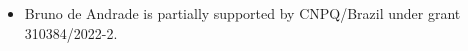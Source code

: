 \documentclass[12pt,reqno]{amsart}
\begin{document}
\begin{itemize}
	\item Bruno de Andrade is partially supported by CNPQ/Brazil under grant 310384/2022-2.
\end{itemize}
			
\end{document}
